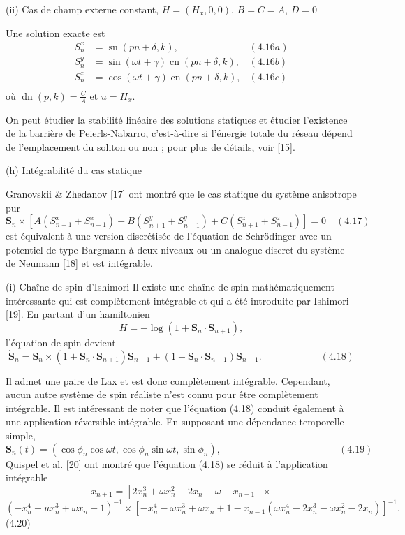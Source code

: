 \documentclass{article}
\begin{document}
   (ii) Cas de champ externe constant, $H = (H_x, 0, 0)$, $B = C = A$, $D = 0$
   
   Une solution exacte est
   \begin{align*}
   S_{n}^{x} &= \operatorname{sn}(pn + \delta, k), & (4.16a) \\
   S_{n}^{y} &= \sin(\omega t + \gamma) \operatorname{cn}(pn + \delta, k), & (4.16b) \\
   S_{n}^{z} &= \cos(\omega t + \gamma) \operatorname{cn}(pn + \delta, k), & (4.16c) \nonumber \\
   \end{align*}
   où $\operatorname{dn}(p, k) = \frac{C}{A}$ et $u = H_x$.
   
   On peut étudier la stabilité linéaire des solutions statiques et étudier l'existence de la barrière de Peierls-Nabarro, c'est-à-dire si l'énergie totale du réseau dépend de l'emplacement du soliton ou non ; pour plus de détails, voir [15].
   
   (h) Intégrabilité du cas statique
   
   Granovskii \& Zhedanov [17] ont montré que le cas statique du système anisotrope pur
   \[
   \mathbf{S}_n \times \left[A(S_{n+1}^{x} + S_{n-1}^{x}) + B(S_{n+1}^{y} + S_{n-1}^{y}) + C(S_{n+1}^{z} + S_{n-1}^{z})\right] = 0 \quad (4.17)
   \]
   est équivalent à une version discrétisée de l'équation de Schrödinger avec un potentiel de type Bargmann à deux niveaux ou un analogue discret du système de Neumann [18] et est intégrable.
   
   (i) Chaîne de spin d'Ishimori
   Il existe une chaîne de spin mathématiquement intéressante qui est complètement intégrable et qui a été introduite par Ishimori [19]. En partant d'un hamiltonien
   \[
   H = -\log(1 + \mathbf{S}_n \cdot \mathbf{S}_{n+1}),
   \]
   l'équation de spin devient
   \[
  \dot{\mathbf{S}}_n = \mathbf{S}_n \times \left(1 + \mathbf{S}_n \cdot \mathbf{S}_{n+1}\right)\mathbf{S}_{n+1} + \left(1 + \mathbf{S}_n \cdot \mathbf{S}_{n-1}\right)\mathbf{S}_{n-1}. \qquad \qquad \qquad (4.18)
  \]
   
   Il admet une paire de Lax et est donc complètement intégrable. Cependant, aucun autre système de spin réaliste n'est connu pour être complètement intégrable. Il est intéressant de noter que l'équation (4.18) conduit également à une application réversible intégrable. En supposant une dépendance temporelle simple,
   \[
  \mathbf{S}_n(t) = (\cos \phi_n \cos \omega t, \cos \phi_n \sin \omega t, \sin \phi_n), \qquad \qquad \qquad \qquad \qquad \qquad (4.19)
  \]
   Quispel et al. [20] ont montré que l'équation (4.18) se réduit à l'application intégrable
  \[
  x_{n+1} = \left[2x_n^3 + \omega x_n^2 + 2x_n - \omega - x_{n-1} \right] \times
  \]
  \[
  \left(-x_n^4 - ux_n^3 + \omega x_n
  + 1\right)^{-1} \times \left[-x_n^4 - \omega x_n^3 + \omega x_n + 1 - x_{n-1}(\omega x_n^4 - 2x_n^3 - \omega x_n^2 - 2x_n)\right]^{-1}.
  \]\qquad (4.20)
   
\end{document}
